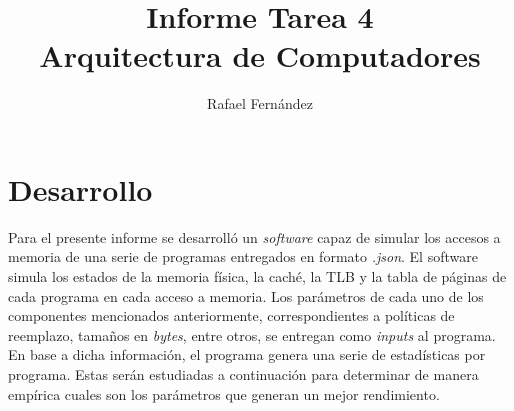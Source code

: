 \documentclass{article}
\title{%
  \vspace{-40mm}
  Informe Tarea 4  \\
  \large Arquitectura de Computadores}
\author{Rafael Fernández}
\begin{document}
\date{}

\maketitle

\section{Desarrollo}
Para el presente informe se desarrolló un \textit{software} capaz de simular los accesos a memoria de una serie de programas entregados en formato \textit{.json}. El software simula los estados de la memoria física, la caché, la TLB y la tabla de páginas de cada programa en cada acceso a memoria. Los parámetros de cada uno de los componentes mencionados anteriormente, correspondientes a políticas de reemplazo, tamaños en \textit{bytes}, entre otros, se entregan como \textit{inputs} al programa.
En base a dicha información, el programa genera una serie de estadísticas por programa. Estas serán estudiadas a continuación para determinar de manera empírica cuales son los parámetros que generan un mejor rendimiento.
\end{document}
